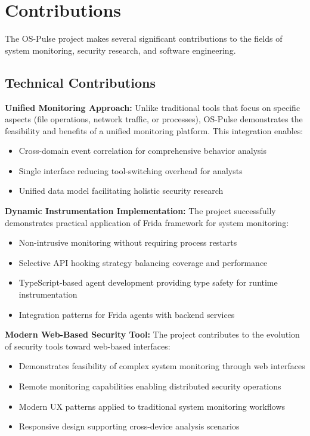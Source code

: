 \section{Contributions}

The OS-Pulse project makes several significant contributions to the fields of system monitoring, security research, and software engineering.

\subsection{Technical Contributions}

\textbf{Unified Monitoring Approach:}
Unlike traditional tools that focus on specific aspects (file operations, network traffic, or processes), OS-Pulse demonstrates the feasibility and benefits of a unified monitoring platform. This integration enables:
\begin{itemize}
    \item Cross-domain event correlation for comprehensive behavior analysis
    \item Single interface reducing tool-switching overhead for analysts
    \item Unified data model facilitating holistic security research
\end{itemize}

\textbf{Dynamic Instrumentation Implementation:}
The project successfully demonstrates practical application of Frida framework for system monitoring:
\begin{itemize}
    \item Non-intrusive monitoring without requiring process restarts
    \item Selective API hooking strategy balancing coverage and performance
    \item TypeScript-based agent development providing type safety for runtime instrumentation
    \item Integration patterns for Frida agents with backend services
\end{itemize}

\textbf{Modern Web-Based Security Tool:}
The project contributes to the evolution of security tools toward web-based interfaces:
\begin{itemize}
    \item Demonstrates feasibility of complex system monitoring through web interfaces
    \item Remote monitoring capabilities enabling distributed security operations
    \item Modern UX patterns applied to traditional system monitoring workflows
    \item Responsive design supporting cross-device analysis scenarios
\end{itemize}

